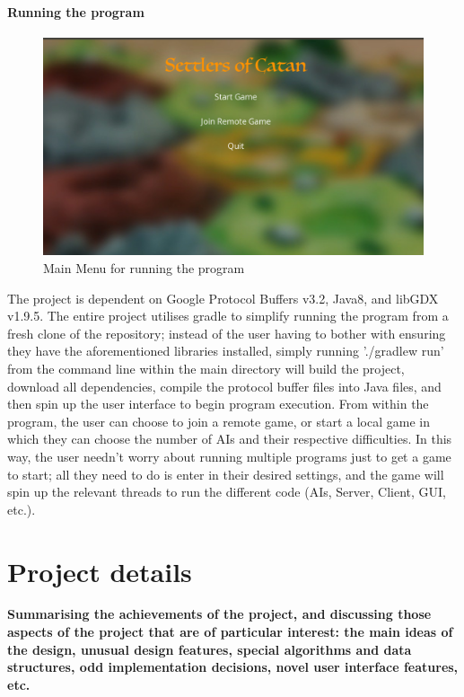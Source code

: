 \documentclass[a4paper,doc,draftfirst]{apa6}
\begin{document}
\paragraph{Running the program}
\begin{figure}[hbtp]
      \includegraphics[width=\textwidth]{MainMenu}
      \caption{Main Menu for running the program}
\end{figure}
The project is dependent on Google Protocol Buffers v3.2, Java8, and libGDX v1.9.5. The entire project utilises gradle to simplify running the program from a fresh clone of the repository; instead of the user having to bother with ensuring they have the aforementioned libraries installed, simply running './gradlew run' from the command line within the main directory will build the project, download all dependencies, compile the protocol buffer files into Java files, and then spin up the user interface to begin program execution. From within the program, the user can choose to join a remote game, or start a local game in which they can choose the number of AIs and their respective difficulties. In this way, the user needn't worry about running multiple programs just to get a game to start; all they need to do is enter in their desired settings, and the game will spin up the relevant threads to run the different code (AIs, Server, Client, GUI, etc.).




\section{Project details}
\textbf{Summarising the achievements of the project, and discussing those aspects of the project that are of particular interest: the main ideas of the design, unusual design features, special algorithms and data structures, odd implementation decisions, novel user interface features, etc.}
\end{document}

